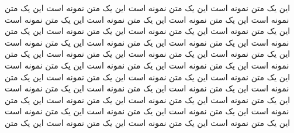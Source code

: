 \documentclass{minimal}
\begin{document}
این یک متن نمونه است  این یک متن نمونه است این یک متن نمونه است این یک متن نمونه است این یک متن نمونه است این یک متن نمونه است این یک متن نمونه است این یک متن نمونه است این یک متن نمونه است این یک متن نمونه است این یک متن نمونه است این یک متن نمونه است این یک متن نمونه است این یک متن نمونه است این یک متن نمونه است این یک متن نمونه است این یک متن نمونه است این یک متن نمونه است این یک متن نمونه است این یک متن نمونه است این یک متن نمونه است این یک متن نمونه است این یک متن نمونه است این یک متن نمونه است این یک متن نمونه است این یک متن نمونه است این یک متن نمونه است 
این یک متن نمونه است  این یک متن نمونه است این یک متن نمونه است این یک متن نمونه است این یک متن نمونه است این یک متن نمونه است این یک متن نمونه است این یک متن نمونه است این یک متن نمونه است این یک متن نمونه است این یک متن نمونه است این یک متن 

\vfill
\end{document}
